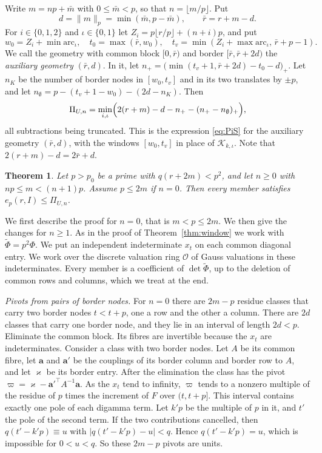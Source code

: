 \documentclass[11pt]{amsart}
\newtheorem{theorem}{Theorem}[section]
\theoremstyle{definition}
\theoremstyle{remark}
\numberwithin{equation}{section}
\newcommand{\cO}{\mathcal O}
\begin{document}
Write $m=np+\bar m$ with $0\le\bar m<p$, so that $n=\lfloor m/p\rfloor$. Put
\[
 d=\|m\|_p=\min(\bar m,p-\bar m),\qquad \bar r=r+m-d .
\]
For $i\in\{0,1,2\}$ and $\iota\in\{0,1\}$ let $Z_i=p\lfloor r/p\rfloor+(n+i)p$, and put
\[
 w_0=Z_i+\min\mathrm{arc}_\iota,\quad t_0=\max(\bar r,w_0),\quad t_v=\min(Z_i+\max\mathrm{arc}_\iota,\,\bar r+p-1).
\]
We call the geometry with common block $[0,\bar r)$ and border $[\bar r,\bar r+2d)$ the \emph{auxiliary geometry}
$(\bar r,d)$. In it, let
$n_+=\bigl(\min(t_v+1,\bar r+2d)-t_0-d\bigr)_+$. Let $n_K$ be the number of border nodes in $[w_0,t_v]$ and in its two
translates by $\pm p$, and let $n_\emptyset=p-(t_v+1-w_0)-(2d-n_K)$. Then
\begin{equation}\label{eq:PiU}
 \Pi_{U,n}=\min_{i,\iota}\Bigl(2(r+m)-d-n_+-(n_+-n_\emptyset)_+\Bigr),
\end{equation}
all subtractions being truncated. This is the expression \eqref{eq:PiS} for the auxiliary geometry $(\bar r,d)$, with the
windows $[w_0,t_v]$ in place of $\mathcal K_{k,\iota}$. Note that $2(r+m)-d=2\bar r+d$.

\begin{theorem}\label{thm:wrap}
Let $p>p_0$ be a prime with $q(r+2m)<p^2$, and let $n\ge0$ with $np\le m<(n+1)p$. Assume $p\le2m$ if $n=0$. Then every
member satisfies $e_p(r,I)\le\Pi_{U,n}$.
\end{theorem}

We first describe the proof for $n=0$, that is $m<p\le2m$. We then give the changes for $n\ge1$. As in the proof of
Theorem~\ref{thm:window} we work with $\widetilde\Phi=p^2\Phi$. We put an independent indeterminate $x_t$ on each common
diagonal entry. We work over the discrete valuation ring $\cO$ of Gauss valuations in these indeterminates. Every member
is a coefficient of $\det\widetilde\Phi$, up to the deletion of common rows and columns, which we treat at the end.

\emph{Pivots from pairs of border nodes.} For $n=0$ there are $2m-p$ residue classes that carry two border nodes $t<t+p$, one a row and the
other a column. There are $2d$ classes that carry one border node, and they lie in an interval of length $2d<p$.
Eliminate the common block. Its fibres are invertible because the $x_t$ are indeterminates. Consider a class with two
border nodes. Let $A$ be its common fibre, let $\mathbf a$ and $\mathbf a'$ be the couplings of its border column and
border row to $A$, and let $\varkappa$ be its border entry. After the elimination the class has the pivot
$\varpi=\varkappa-\mathbf a'^{\top}A^{-1}\mathbf a$. As the $x_t$ tend to infinity, $\varpi$ tends to a nonzero multiple
of the residue of $p$ times the increment of $F$ over $(t,t+p]$. This interval contains exactly one pole of each
digamma term. Let $k'p$ be the multiple of $p$ in it, and $t'$ the pole of the second term. If the two contributions
cancelled, then $q(t'-k'p)\equiv u$ with $|q(t'-k'p)-u|<q$. Hence $q(t'-k'p)=u$, which is impossible for $0<u<q$. So
these $2m-p$ pivots are units.
\end{document}
